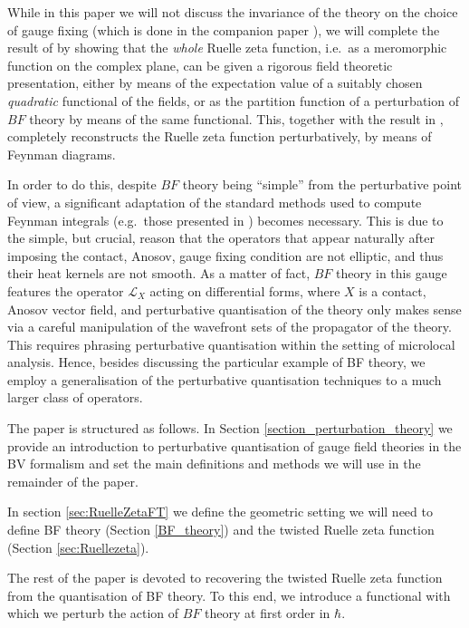 \documentclass[reqno]{amsart}
\theoremstyle{definition}
\theoremstyle{remark}
\renewcommand{\L}{\mathcal{L}}
\begin{document}
While in this paper we will not discuss the invariance of the theory on the choice of gauge fixing (which is done in the companion paper \cite{Schiavina_Stucker1}), we will complete the result of \cite{hadfield_kandel_schiavina} by showing that the \emph{whole} Ruelle zeta function, i.e.\ as a meromorphic function on the complex plane, can be given a rigorous field theoretic presentation, either by means of the expectation value of a suitably chosen \emph{quadratic} functional of the fields, or as the partition function of a perturbation of $BF$ theory by means of the same functional. This, together with the result in \cite{hadfield_kandel_schiavina}, completely reconstructs the Ruelle zeta function perturbatively, by means of Feynman diagrams.

In order to do this, despite $BF$ theory being ``simple'' from the perturbative point of view, a significant adaptation of the standard methods used to compute Feynman integrals (e.g.\ those presented in \cite{costello}) becomes necessary. This is due to the simple, but crucial, reason that the operators that appear naturally after imposing the contact, Anosov, gauge fixing condition are not elliptic, and thus their heat kernels are not smooth. %
As a matter of fact, $BF$ theory in this gauge features the operator $\L_X$ acting on differential forms, where $X$ is a contact, Anosov vector field, and perturbative quantisation of the theory only makes sense via a careful manipulation of the wavefront sets of the propagator of the theory. This requires phrasing perturbative quantisation within the setting of microlocal analysis. Hence, besides discussing the particular example of BF theory, we employ a generalisation of the perturbative quantisation techniques to a much larger class of operators.

The paper is structured as follows. In Section \ref{section_perturbation_theory} we provide an introduction to perturbative quantisation of gauge field theories in the BV formalism and set the main definitions and methods we will use in the remainder of the paper.

In section \ref{sec:RuelleZetaFT} we define the geometric setting we will need to define BF theory (Section \ref{BF_theory}) and the twisted Ruelle zeta function (Section \ref{sec:Ruellezeta}). 

The rest of the paper is devoted to recovering the twisted Ruelle zeta function from the quantisation of BF theory. %
To this end, we introduce a functional with which we perturb the action of $BF$ theory at first order in $\hbar$. 
\end{document}
